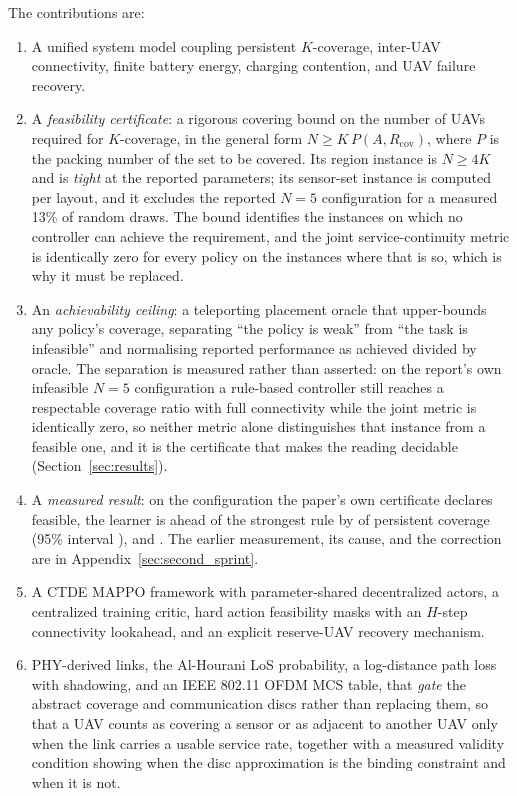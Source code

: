 \documentclass[conference]{IEEEtran}
\begin{document}
The contributions are:
\begin{enumerate}
    \item A unified system model coupling persistent $K$-coverage, inter-UAV connectivity, finite battery energy, charging contention, and UAV failure recovery.
    \item A \emph{feasibility certificate}: a rigorous covering bound on the number of UAVs required for $K$-coverage, in the general form $N \ge K\,P(A,R_{\mathrm{cov}})$, where $P$ is the packing number of the set to be covered.  Its region instance is $N \ge 4K$ and is \emph{tight} at the reported parameters; its sensor-set instance is computed per layout, and it excludes the reported $N=5$ configuration for a measured 13\% of random draws.  The bound identifies the instances on which no controller can achieve the requirement, and the joint service-continuity metric is identically zero for every policy on the instances where that is so, which is why it must be replaced.
    \item An \emph{achievability ceiling}: a teleporting placement oracle that upper-bounds any policy's coverage, separating ``the policy is weak'' from ``the task is infeasible'' and normalising reported performance as achieved divided by oracle.  The separation is measured rather than asserted: on the report's own infeasible $N=5$ configuration a rule-based controller still reaches a respectable coverage ratio with full connectivity while the joint metric is identically zero, so neither metric alone distinguishes that instance from a feasible one, and it is the certificate that makes the reading decidable (Section~\ref{sec:results}).
    \item A \emph{measured result}: on the configuration the paper's own certificate declares feasible, the learner is ahead of the strongest rule by \tokLearnerMinusRule{} of persistent coverage (95\% interval \tokLearnerMinusRuleCi), and \tokGapVerdict.  The earlier measurement, its cause, and the correction are in Appendix~\ref{sec:second_sprint}.
    \item A CTDE MAPPO framework with parameter-shared decentralized actors, a centralized training critic, hard action feasibility masks with an $H$-step connectivity lookahead, and an explicit reserve-UAV recovery mechanism.
    \item PHY-derived links, the Al-Hourani LoS probability, a log-distance path loss with shadowing, and an IEEE 802.11 OFDM MCS table, that \emph{gate} the abstract coverage and communication discs rather than replacing them, so that a UAV counts as covering a sensor or as adjacent to another UAV only when the link carries a usable service rate, together with a measured validity condition showing when the disc approximation is the binding constraint and when it is not.

\end{enumerate}
\end{document}
